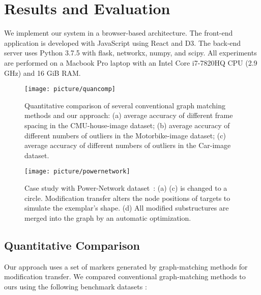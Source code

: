 \section{Results and Evaluation}

We implement our system in a browser-based architecture.
The front-end application is developed with JavaScript using React and D3. The back-end server uses Python 3.7.5 with flask, networkx, numpy, and scipy. All experiments are performed on a Macbook Pro laptop with an Intel Core i7-7820HQ CPU (2.9 GHz) and 16 GiB RAM. 

\begin{figure}[t!p]
    \centering
    \setlength{\belowcaptionskip}{-5pt}
    \texttt{[image: picture/quancomp]}
    \caption{Quantitative comparison of several conventional graph matching methods and our approach: (a) average accuracy of different frame spacing in the CMU-house-image dataset; (b) average accuracy of different numbers of outliers in the Motorbike-image dataset; (c) average accuracy of different numbers of outliers in the Car-image dataset.}
    \label{fig:quancomp}
\end{figure} 


\begin{figure*}[htb]
    \centering
    \setlength{\belowcaptionskip}{-5pt}
    \texttt{[image: picture/powernetwork]}
    \caption{Case study with Power-Network dataset~\cite{nr}: (a)  (c)  is changed to a circle.   Modification transfer alters the node positions of targets to simulate the exemplar's shape. (d) All modified substructures are merged into the graph by an automatic optimization. }
    \label{fig:powernetwork}
\end{figure*}

\subsection {Quantitative Comparison} \label{sec:quancomp}
Our approach 
uses
a set of markers generated by graph-matching methods for modification transfer. 
We compared conventional graph-matching methods to ours
using the following benchmark datasets :

